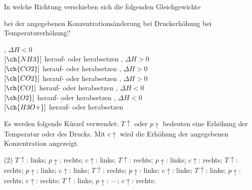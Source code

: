 \documentclass[DIV11]{scrartcl}
\begin{document}
\begin{question}[name=Prinzip vom kleinsten Zwang]
In welche Richtung verschieben sich die folgenden Gleichgewichte
\begin{tasks}[counter-format=tsk.]
 \task bei der angegebenen Konzentrationsänderung
 \task bei Druckerhöhung
 \task bei Temperaturerhöhung?
\end{tasks}
\begin{tasks}
  \task {}, $\Delta H < 0$\\
    $[\ch{NH3}]$ herauf- oder herabsetzen
  \task {}, $\Delta H > 0$\\
    $[\ch{CO2}]$ herauf- oder herabsetzen
  \task {},
    $\Delta H > 0$\\
    $[\ch{CO2}]$ herauf- oder herabsetzen
  \task {}, $\Delta H > 0$\\
    $[\ch{CO}]$ herauf- oder herabsetzen
  \task {}, $\Delta H < 0$\\
    $[\ch{O2}]$ herauf- oder herabsetzen
  \task {}, $\Delta H < 0$\\
    $[\ch{H3O+}]$ herauf- oder herabsetzen
\end{tasks}
\end{question}
\begin{solution}
  Es werden folgende Kürzel verwendet: $T\uparrow$ oder $p\uparrow$ bedeuten
  eine Erhöhung der Temperatur oder des Drucks. Mit $c\uparrow$ wird die
  Erhöhung der angegebenen Konzentration angezeigt.
  \begin{tasks}(2)
    \task $T\uparrow$: links;  $p\uparrow$: rechts; $c\uparrow$: links;
    \task $T\uparrow$: rechts; $p\uparrow$: links;  $c\uparrow$: rechts;
    \task $T\uparrow$: rechts; $p\uparrow$: links;  $c\uparrow$: links;
    \task $T\uparrow$: rechts; $p\uparrow$: links;  $c\uparrow$: links;
    \task $T\uparrow$: links;  $p\uparrow$: rechts; $c\uparrow$: rechts;
    \task $T\uparrow$: links;  $p\uparrow$: ---;    $c\uparrow$: rechts;
  \end{tasks}
\end{solution}
\end{document}
